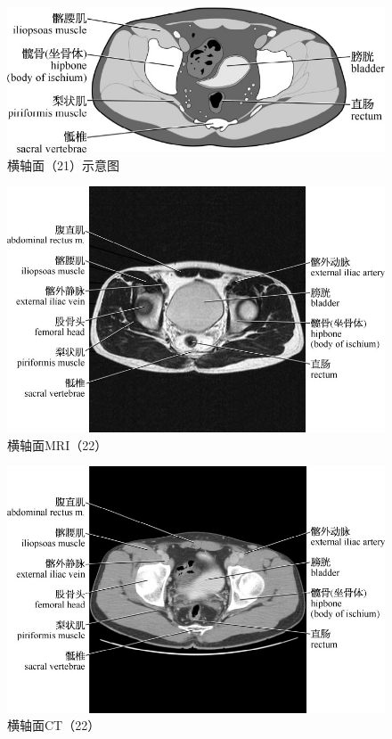 \begin{figure}[!htbp]
 \centering
 \includegraphics{./images/Image00064.jpg}
 \captionsetup{justification=centering}
 \caption{横轴面（21）示意图}
  \end{figure} 
 \FloatBarrier

\begin{figure}[!htbp]
 \centering
 \includegraphics{./images/Image00065.jpg}
 \captionsetup{justification=centering}
 \caption{横轴面MRI（22）}
  \end{figure} 
 \FloatBarrier

\begin{figure}[!htbp]
 \centering
 \includegraphics{./images/Image00066.jpg}
 \captionsetup{justification=centering}
 \caption{横轴面CT（22）}
  \end{figure} 
 \FloatBarrier

